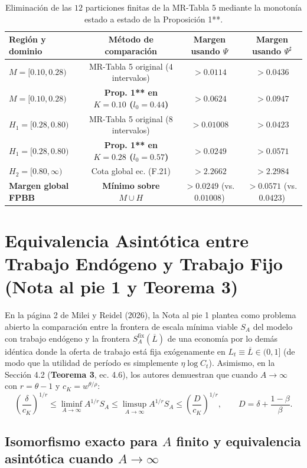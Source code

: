 \documentclass[11pt,letterpaper]{article}
\theoremstyle{plain}
\begin{document}
\begin{table}[htbp]
\centering
\small
\begin{tabular}{@{}lccc@{}}
\toprule
\textbf{Región y dominio} & \textbf{Método de comparación} & \textbf{Margen usando $\Psi$} & \textbf{Margen usando $\Psi^\sharp$} \\
\midrule
$M=[0.10,0.28)$ & MR-Tabla 5 original ($4$ intervalos) & $>0.0114$ & $>0.0436$ \\
$M=[0.10,0.28)$ & \textbf{Prop. 1** en $K=0.10$ ($l_0=0.44$)} & \textbf{$>0.0624$} & \textbf{$>0.0947$} \\
$H_1=[0.28,0.80)$ & MR-Tabla 5 original ($8$ intervalos) & $>0.01008$ & $>0.0423$ \\
$H_1=[0.28,0.80)$ & \textbf{Prop. 1** en $K=0.28$ ($l_0=0.57$)} & \textbf{$>0.0249$} & \textbf{$>0.0571$} \\
$H_2=[0.80,\infty)$ & Cota global ec. (F.21) & $>2.2662$ & $>2.2984$ \\
\midrule
\textbf{Margen global FPBB} & \textbf{Mínimo sobre $M\cup H$} & \textbf{$>0.0249$} (vs. $0.01008$) & \textbf{$>0.0571$} (vs. $0.0423$) \\
\bottomrule
\end{tabular}
\caption{Eliminación de las $12$ particiones finitas de la MR-Tabla 5 mediante la monotonía estado a estado de la Proposición 1**.}
\end{table}

\section{Equivalencia Asintótica entre Trabajo Endógeno y Trabajo Fijo (Nota al pie 1 y Teorema 3)}

En la página 2 de Milei y Reidel (2026), la Nota al pie 1 plantea como problema abierto la comparación entre la frontera de escala mínima viable $S_A$ del modelo con trabajo endógeno y la frontera $S_A^{\mathrm{fix}}(\overline{L})$ de una economía por lo demás idéntica donde la oferta de trabajo está fija exógenamente en $L_t\equiv\overline{L}\in(0,1]$ (de modo que la utilidad de período es simplemente $\eta\log C_t$). Asimismo, en la Sección 4.2 (\textbf{Teorema 3}, ec. 4.6), los autores demuestran que cuando $A\to\infty$ con $r=\theta-1$ y $c_K=w^{\theta/\rho}$:
\[
\left(\frac{\delta}{c_K}\right)^{1/r} \le \liminf_{A\to\infty} A^{1/r} S_A \le \limsup_{A\to\infty} A^{1/r} S_A \le \left(\frac{D}{c_K}\right)^{1/r}, \qquad D = \delta + \frac{1-\beta}{\beta}.
\]

\subsection{\texorpdfstring{Isomorfismo exacto para $A$ finito y equivalencia asintótica cuando $A\to\infty$}{Isomorfismo exacto para A finito y equivalencia asintótica cuando A -> infinito}}
\end{document}
